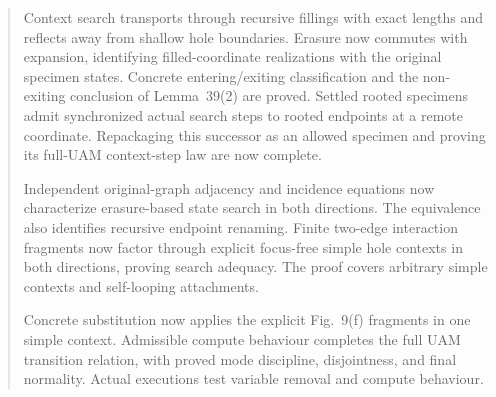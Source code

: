 \documentclass[11pt,a4paper]{article}
\theoremstyle{definition}
\theoremstyle{plain}
\theoremstyle{remark}
\begin{document}
\begin{abstract}
Context search transports through recursive fillings with exact lengths and
reflects away from shallow hole boundaries. Erasure now commutes with expansion,
identifying filled-coordinate realizations with the original specimen states.
Concrete entering/exiting classification and the non-exiting conclusion of
Lemma~39(2) are proved. Settled rooted specimens admit synchronized actual search
steps to rooted endpoints at a remote coordinate. Repackaging this successor as
an allowed specimen and proving its full-UAM context-step law are now complete.

Independent original-graph adjacency and incidence equations now characterize
erasure-based state search in both directions. The equivalence also identifies
recursive endpoint renaming. Finite two-edge interaction fragments now factor
through explicit focus-free simple hole contexts in both directions, proving
search adequacy. The proof covers arbitrary simple contexts and self-looping
attachments.

Concrete substitution now applies the explicit Fig.~9(f) fragments in one
simple context. Admissible compute behaviour completes the full UAM transition
relation, with proved mode discipline, disjointness, and final normality.
Actual executions test variable removal and compute behaviour.


\end{abstract}
\end{document}
